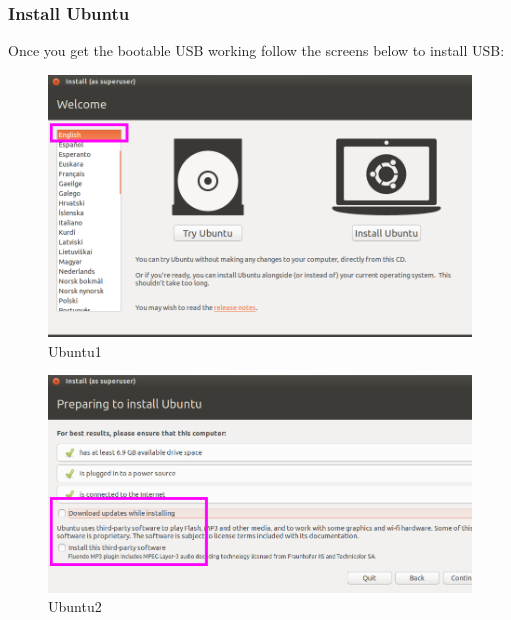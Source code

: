 \subsubsection{Install Ubuntu}
Once you get the bootable USB working follow the screens below to install USB:
\begin{figure}[!ht]
	\centering
	\includegraphics[scale=0.5]{input/images/ubuntu1.png}                   
	\caption{Ubuntu1}
	\hspace{-1.5em}
\end{figure}
\begin{figure}[!ht]
	\centering
	\includegraphics[scale=0.5]{input/images/ub2.png}                   
	\caption{Ubuntu2}
	\hspace{-1.5em}
\end{figure}

